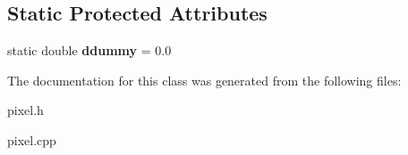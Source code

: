 \subsection*{Static Protected Attributes}
\begin{DoxyCompactItemize}
\item 
\hypertarget{classBasePixel_ac75c55df1b85f8a82287a055e8b76585}{
static double {\bfseries ddummy} = 0.0}
\label{classBasePixel_ac75c55df1b85f8a82287a055e8b76585}

\end{DoxyCompactItemize}


The documentation for this class was generated from the following files:\begin{DoxyCompactItemize}
\item 
pixel.h\item 
pixel.cpp\end{DoxyCompactItemize}
